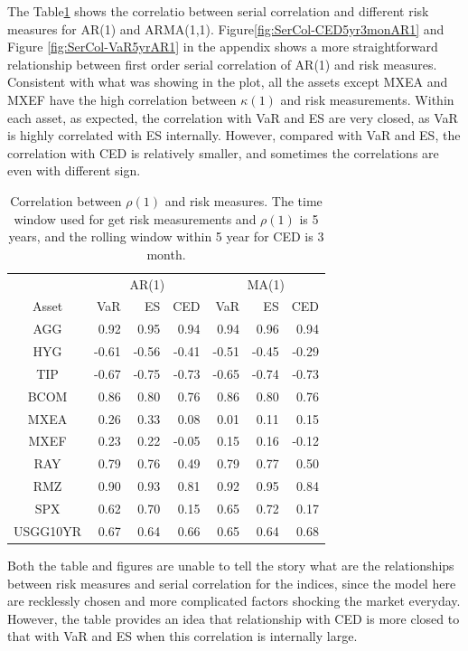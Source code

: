 \documentclass[11pt]{article}
\begin{document}
The Table\ref{table:corSerialRisk} shows the correlatio between serial correlation and different risk measures for AR(1) and ARMA(1,1). Figure\ref{fig:SerCol-CED5yr3monAR1} and Figure \ref{fig:SerCol-VaR5yrAR1}
 in the appendix shows a more straightforward relationship between first order serial correlation of AR(1) and risk measures. Consistent with what was showing in the plot, all the assets except MXEA and MXEF have the high correlation between $\kappa(1)$ and risk measurements. Within each asset, as expected, the correlation with VaR and ES are very closed, as VaR is highly correlated with ES internally. However, compared with VaR and ES, the correlation with CED is relatively smaller, and sometimes the correlations are even with different sign.

\begin{table}[H]
\centering 
\begin{tabular}{ | c || r r r|| r r r | } 
 \hline
 &\multicolumn{3}{c|}{AR(1)} &\multicolumn{3}{c|}{MA(1)} \\
 \cline{2-7}
Asset & VaR  & ES & CED & VaR  & ES & CED \\
  \hline \hline
AGG & 0.92 & 0.95 & 0.94  & 0.94 & 0.96 & 0.94  \\ 
HYG & -0.61 & -0.56 &  -0.41 & -0.51 & -0.45 &  -0.29  \\ 
TIP & -0.67 & -0.75 &  -0.73 & -0.65 & -0.74 &  -0.73\\ 
BCOM & 0.86 & 0.80 & 0.76 & 0.86 & 0.80 & 0.76\\ 
MXEA & 0.26 & 0.33 & 0.08& 0.01 & 0.11 & 0.15 \\ 
MXEF & 0.23 & 0.22 & -0.05& 0.15 & 0.16 & -0.12  \\ 
RAY & 0.79 & 0.76 & 0.49 & 0.79 & 0.77 & 0.50 \\ 
RMZ & 0.90 & 0.93 &  0.81 & 0.92 & 0.95 &  0.84\\ 
SPX & 0.62 & 0.70 & 0.15 & 0.65 & 0.72 & 0.17\\ 
USGG10YR & 0.67 & 0.64 &  0.66 & 0.65 & 0.64 &  0.68\\
 \hline
\end{tabular}
\caption{Correlation between $\rho(1)$ and risk measures. The time window used for get risk measurements and $\rho(1)$ is 5 years, and the rolling window within 5 year for CED is 3 month.}
\label{table:corSerialRisk}
\end{table}

Both the table and figures are unable to tell the story what are the relationships between risk measures and serial correlation for the indices, since the model here are recklessly chosen and more complicated factors shocking the market everyday. However, the table provides an idea that relationship with CED is more closed to that with VaR and ES when this correlation is internally large.
\end{document}
